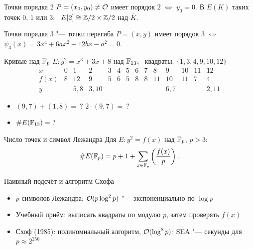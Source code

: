 \documentclass{ca-slides}
\begin{document}
\begin{theoremframe}[proposition]{Точки порядка 2}
  $P = (x_0, y_0) \ne \mathcal{O}$ имеет порядок $2$ $\iff$ $y_0 = 0$. В $E(K)$ таких точек $0$, $1$
  или $3$; \ $E[2] \cong \mathbb{Z}/2 \times \mathbb{Z}/2$ над $\overline K$.
\end{theoremframe}

\begin{theoremframe}[proposition]{Точки порядка 3 "--- точки перегиба}
  $P = (x, y)$ имеет порядок $3$ $\iff$ $\psi_3(x) = 3x^4 + 6ax^2 + 12bx - a^2 = 0$.
\end{theoremframe}

\begin{canvasframe}{Кривые над $\mathbb{F}_{p}$}
  $E\colon y^2 = x^3 + 3x + 8$ над $\mathbb{F}_{13}$; \ квадраты: $\{1, 3, 4, 9, 10, 12\}$
  \[
  \begin{array}{c|ccccccccccccc}
  x & 0 & 1 & 2 & 3 & 4 & 5 & 6 & 7 & 8 & 9 & 10 & 11 & 12\\ \hline
  f(x) & 8 & 12 & 9 & 5 & 6 & 5 & 8 & 8 & 11 & 10 & 11 & 7 & 4\\
  y & & 5, 8 & 3, 10 & & & & & & & 6, 7 & & & 2, 11
  \end{array}
  \]
  \begin{itemize}
    \item $(9, 7) + (1, 8) = \ ?$ \qquad $2 \cdot (9, 7) = \ ?$
    \item $\#E(\mathbb{F}_{13}) = \ ?$
  \end{itemize}
  \penspace[0.2\textheight]
\end{canvasframe}

\begin{theoremframe}{Число точек и символ Лежандра}
  Для $E\colon y^2 = f(x)$ над $\mathbb{F}_{p}$, $p > 3$:
  \[ \#E(\mathbb{F}_{p}) = p + 1 + \sum_{x \in \mathbb{F}_{p}} \left(\frac{f(x)}{p}\right). \]
\end{theoremframe}

\begin{canvasframe}{Наивный подсчёт и алгоритм Схофа}
  \begin{itemize}
    \item $p$ символов Лежандра: $\mathcal{O}(p \log^2 p)$ "--- экспоненциально по $\log p$
    \item Учебный приём: выписать квадраты по модулю $p$, затем проверять $f(x)$
    \item Схоф (1985): полиномиальный алгоритм, $\mathcal{O}(\log^8 p)$; SEA "--- секунды для
      $p \approx 2^{256}$
  \end{itemize}
  \notearea[0.3\textheight]
\end{canvasframe}
\end{document}
